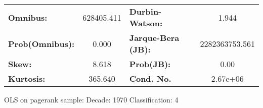\begin{center}
\begin{tabular}{lccccc}
\bottomrule
\end{tabular}
\begin{tabular}{lclc}
\textbf{Omnibus:}       & 628405.411 & \textbf{  Durbin-Watson:     } &       1.944     \\
\textbf{Prob(Omnibus):} &    0.000   & \textbf{  Jarque-Bera (JB):  } & 2282363753.561  \\
\textbf{Skew:}          &    8.618   & \textbf{  Prob(JB):          } &        0.00     \\
\textbf{Kurtosis:}      &  365.640   & \textbf{  Cond. No.          } &    2.67e+06     \\
\bottomrule
\end{tabular}
\end{center}
\break
OLS on pagerank sample: Decade: 1970 Classification: 4
